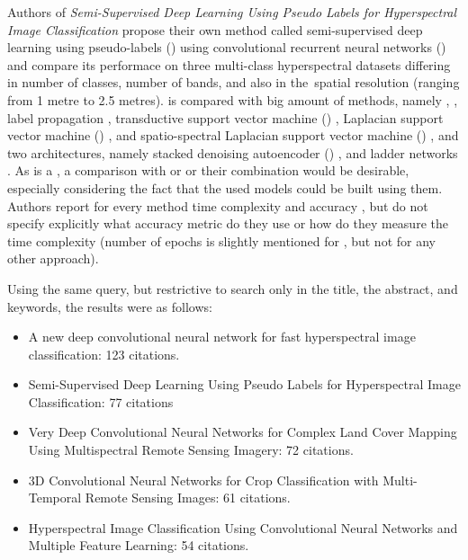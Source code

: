 Authors of \textit{Semi-Supervised Deep Learning Using Pseudo Labels for Hyperspectral Image Classification} propose their own method called semi-supervised deep learning using pseudo-labels () using convolutional recurrent neural networks () and compare its performace on three multi-class hyperspectral datasets differing in number of classes, number of bands, and also in the~spatial resolution (ranging from 1 metre to 2.5 metres).  is compared with big amount of  methods, namely , , label propagation \cite{label-prop}, transductive support vector machine () \cite{tsvm}, Laplacian support vector machine () \cite{lapsvm}, and spatio-spectral Laplacian support vector machine () \cite{ss-lapsvm}, and two  architectures, namely stacked denoising autoencoder () \cite{sda}, and ladder networks \cite{ladder-networks}. As  is a , a comparison with  or  or their combination would be desirable, especially considering the fact that the used  models could be built using them. Authors report for every method time complexity and accuracy , but do not specify explicitly what accuracy metric do they use or how do they measure the time complexity (number of epochs is slightly mentioned for , but not for any other approach).

Using the same query, but restrictive to search only in the title, the abstract, and keywords, the results were as follows:

\begin{itemize}
	\item A new deep convolutional neural network for fast hyperspectral image classification: 123 citations.  \cite{cnn-hs-class}
	\item Semi-Supervised Deep Learning Using Pseudo Labels for Hyperspectral Image Classification: 77 citations \cite{semi-supervised-hyperspectral}
	\item Very Deep Convolutional Neural Networks for Complex Land Cover Mapping Using Multispectral Remote Sensing Imagery: 72 citations. \cite{very-deep-cnn-lc}
	\item 3D Convolutional Neural Networks for Crop Classification with Multi-Temporal Remote Sensing Images: 61 citations. \cite{3d-cnn-crop}
	\item Hyperspectral Image Classification Using Convolutional Neural Networks and Multiple Feature Learning: 54 citations. \cite{hyperspectral-multiple-feat-cnn}
\end{itemize}

